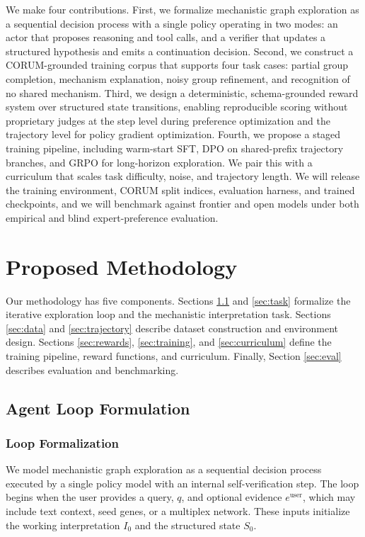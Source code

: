 \documentclass[thesis,letterpaper,12pt]{utthesis}
\begin{document}
We make four contributions. First, we formalize mechanistic graph exploration as a sequential decision process with a single policy operating in two modes: an actor that proposes reasoning and tool calls, and a verifier that updates a structured hypothesis and emits a continuation decision. Second, we construct a CORUM-grounded training corpus that supports four task cases: partial group completion, mechanism explanation, noisy group refinement, and recognition of no shared mechanism. Third, we design a deterministic, schema-grounded reward system over structured state transitions, enabling reproducible scoring without proprietary judges at the step level during preference optimization and the trajectory level for policy gradient optimization. Fourth, we propose a staged training pipeline, including warm-start SFT, DPO on shared-prefix trajectory branches, and GRPO for long-horizon exploration. We pair this with a curriculum that scales task difficulty, noise, and trajectory length. We will release the training environment, CORUM split indices, evaluation harness, and trained checkpoints, and we will benchmark against frontier and open models under both empirical and blind expert-preference evaluation.


\section{Proposed Methodology}\label{sec:methods}
Our methodology has five components. Sections \ref{sec:agent_loop} and \ref{sec:task} formalize the iterative exploration loop and the mechanistic interpretation task. Sections \ref{sec:data} and \ref{sec:trajectory} describe dataset construction and environment design. Sections \ref{sec:rewards}, \ref{sec:training}, and \ref{sec:curriculum} define the training pipeline, reward functions, and curriculum. Finally, Section \ref{sec:eval} describes evaluation and benchmarking.

\subsection{Agent Loop Formulation}\label{sec:agent_loop}
\subsubsection{Loop Formalization}
We model mechanistic graph exploration as a sequential decision process executed by a single policy model with an internal self-verification step. The loop begins when the user provides a query, $q$, and optional evidence $e^{\text{user}}$, which may include text context, seed genes, or a multiplex network. These inputs initialize the working interpretation $I_0$ and the structured state $S_0$.
\end{document}
